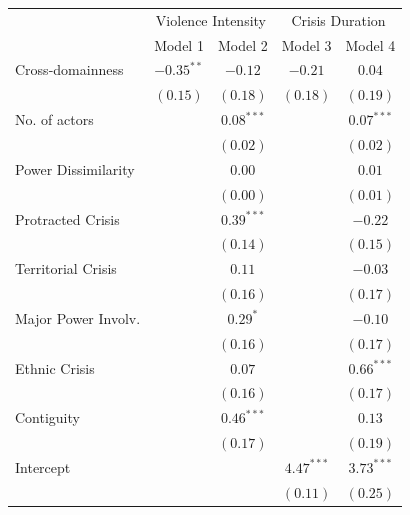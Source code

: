 \documentclass[
]{article}
\begin{document}
\begin{table}[h!]
\begin{center}
\begin{tabular}{l c c c c}
\hline
 & \multicolumn{2}{c}{Violence Intensity} & \multicolumn{2}{c}{Crisis Duration} \\
\cline{2-3} \cline{4-5}
 & Model 1 & Model 2 & Model 3 & Model 4 \\
\hline
Cross-domainness    & $-0.35^{**}$ & $-0.12$      & $-0.21$      & $0.04$       \\
                    & $(0.15)$     & $(0.18)$     & $(0.18)$     & $(0.19)$     \\
No. of actors       &              & $0.08^{***}$ &              & $0.07^{***}$ \\
                    &              & $(0.02)$     &              & $(0.02)$     \\
Power Dissimilarity &              & $0.00$       &              & $0.01$       \\
                    &              & $(0.00)$     &              & $(0.01)$     \\
Protracted Crisis   &              & $0.39^{***}$ &              & $-0.22$      \\
                    &              & $(0.14)$     &              & $(0.15)$     \\
Territorial Crisis  &              & $0.11$       &              & $-0.03$      \\
                    &              & $(0.16)$     &              & $(0.17)$     \\
Major Power Involv. &              & $0.29^{*}$   &              & $-0.10$      \\
                    &              & $(0.16)$     &              & $(0.17)$     \\
Ethnic Crisis       &              & $0.07$       &              & $0.66^{***}$ \\
                    &              & $(0.16)$     &              & $(0.17)$     \\
Contiguity          &              & $0.46^{***}$ &              & $0.13$       \\
                    &              & $(0.17)$     &              & $(0.19)$     \\
Intercept           &              &              & $4.47^{***}$ & $3.73^{***}$ \\
                    &              &              & $(0.11)$     & $(0.25)$     \\

\end{tabular}
\end{center}
\end{table}
\end{document}
